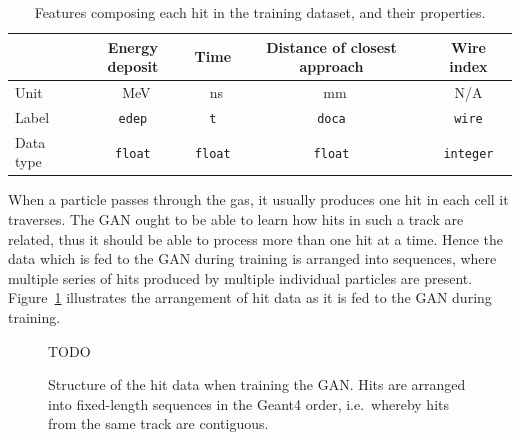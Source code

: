 \begin{table}[]
    \setlength{\tabcolsep}{12pt}
    \centering
    \begin{tabular}{l|cccc}
        \toprule
        & \bfseries Energy deposit & \bfseries Time & \bfseries Distance of closest approach & \bfseries Wire index  \\
        \midrule
        Unit & \SI{}{\MeV} & \SI{}{\ns} & \SI{}{\mm} & N/A \\
        Label & \texttt{edep} & \texttt{t} & \texttt{doca} & \texttt{wire} \\
        Data type & \texttt{float} & \texttt{float} & \texttt{float} & \texttt{integer}
        \\\bottomrule
    \end{tabular}
    \caption{Features composing each hit in the training dataset, and their properties.}
    \label{tab:gan_features}
\end{table}

When a particle passes through the gas, it usually produces one hit in each cell it traverses. The GAN ought to be able to learn how hits in such a track are related, thus it should be able to process more than one hit at a time. Hence the data which is fed to the GAN during training is arranged into sequences, where multiple series of hits produced by multiple individual particles are present. Figure~\ref{fig:hit_data_structure} illustrates the arrangement of hit data as it is fed to the GAN during training. 

\begin{figure}
    \centering
    TODO
    \caption{Structure of the hit data when training the GAN. Hits are arranged into fixed-length sequences in the {\sc Geant4} order, i.e.\ whereby hits from the same track are contiguous.}
    \label{fig:hit_data_structure}
\end{figure}



